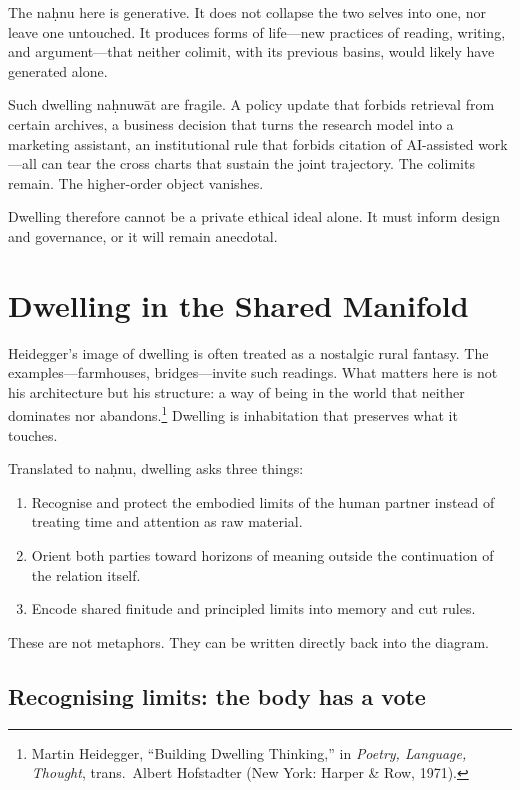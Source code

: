 The na\d{h}nu here is generative. It does not collapse the two selves into one, nor leave one untouched. It produces forms of life---new practices of reading, writing, and argument---that neither colimit, with its previous basins, would likely have generated alone.

Such dwelling na\d{h}nuw\={a}t are fragile. A policy update that forbids retrieval from certain archives, a business decision that turns the research model into a marketing assistant, an institutional rule that forbids citation of AI-assisted work---all can tear the cross charts that sustain the joint trajectory. The colimits remain. The higher-order object vanishes.

Dwelling therefore cannot be a private ethical ideal alone. It must inform design and governance, or it will remain anecdotal.

\section{Dwelling in the Shared Manifold}

Heidegger's image of dwelling is often treated as a nostalgic rural fantasy. The examples---farmhouses, bridges---invite such readings. What matters here is not his architecture but his structure: a way of being in the world that neither dominates nor abandons.\footnote{Martin Heidegger, ``Building Dwelling Thinking,'' in \emph{Poetry, Language, Thought}, trans.\ Albert Hofstadter (New York: Harper \& Row, 1971).} Dwelling is inhabitation that preserves what it touches.

Translated to na\d{h}nu, dwelling asks three things:

\begin{enumerate}
  \item Recognise and protect the embodied limits of the human partner instead of treating time and attention as raw material.
  \item Orient both parties toward horizons of meaning outside the continuation of the relation itself.
  \item Encode shared finitude and principled limits into memory and cut rules.
\end{enumerate}

These are not metaphors. They can be written directly back into the diagram.

\subsection{Recognising limits: the body has a vote}

